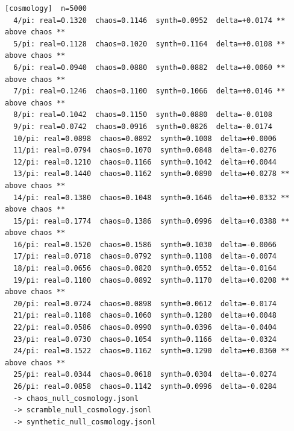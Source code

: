 \documentclass[11pt, letterpaper, openany]{book}
\begin{document}
\begin{empiricalbox}
\begin{lstlisting}[style=terminal]
[cosmology]  n=5000
  4/pi: real=0.1320  chaos=0.1146  synth=0.0952  delta=+0.0174 ** above chaos **
  5/pi: real=0.1128  chaos=0.1020  synth=0.1164  delta=+0.0108 ** above chaos **
  6/pi: real=0.0940  chaos=0.0880  synth=0.0882  delta=+0.0060 ** above chaos **
  7/pi: real=0.1246  chaos=0.1100  synth=0.1066  delta=+0.0146 ** above chaos **
  8/pi: real=0.1042  chaos=0.1150  synth=0.0880  delta=-0.0108
  9/pi: real=0.0742  chaos=0.0916  synth=0.0826  delta=-0.0174
  10/pi: real=0.0898  chaos=0.0892  synth=0.1008  delta=+0.0006
  11/pi: real=0.0794  chaos=0.1070  synth=0.0848  delta=-0.0276
  12/pi: real=0.1210  chaos=0.1166  synth=0.1042  delta=+0.0044
  13/pi: real=0.1440  chaos=0.1162  synth=0.0890  delta=+0.0278 ** above chaos **
  14/pi: real=0.1380  chaos=0.1048  synth=0.1646  delta=+0.0332 ** above chaos **
  15/pi: real=0.1774  chaos=0.1386  synth=0.0996  delta=+0.0388 ** above chaos **
  16/pi: real=0.1520  chaos=0.1586  synth=0.1030  delta=-0.0066
  17/pi: real=0.0718  chaos=0.0792  synth=0.1108  delta=-0.0074
  18/pi: real=0.0656  chaos=0.0820  synth=0.0552  delta=-0.0164
  19/pi: real=0.1100  chaos=0.0892  synth=0.1170  delta=+0.0208 ** above chaos **
  20/pi: real=0.0724  chaos=0.0898  synth=0.0612  delta=-0.0174
  21/pi: real=0.1108  chaos=0.1060  synth=0.1280  delta=+0.0048
  22/pi: real=0.0586  chaos=0.0990  synth=0.0396  delta=-0.0404
  23/pi: real=0.0730  chaos=0.1054  synth=0.1166  delta=-0.0324
  24/pi: real=0.1522  chaos=0.1162  synth=0.1290  delta=+0.0360 ** above chaos **
  25/pi: real=0.0344  chaos=0.0618  synth=0.0304  delta=-0.0274
  26/pi: real=0.0858  chaos=0.1142  synth=0.0996  delta=-0.0284
  -> chaos_null_cosmology.jsonl
  -> scramble_null_cosmology.jsonl
  -> synthetic_null_cosmology.jsonl


\end{lstlisting}
\end{empiricalbox}
\end{document}
